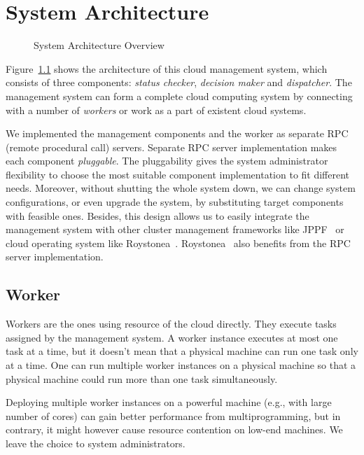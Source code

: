\chapter{System Architecture}


\begin{figure}
  \centering
  
  \caption{System Architecture Overview}
  \label{fig:archi-overview}
\end{figure}

Figure~\ref{fig:archi-overview} shows the architecture of this cloud
management system, which consists of three components: \emph{status
checker}, \emph{decision maker} and \emph{dispatcher}.  The management
system can form a complete cloud computing system by connecting with a
number of \emph{workers} or work as a part of existent cloud systems.

We implemented the management components and the worker as separate RPC
(remote procedural call) servers.  Separate RPC server implementation
makes each component \emph{pluggable}.  The pluggability gives the
system administrator flexibility to choose the most suitable component
implementation to fit different needs.  Moreover, without shutting the
whole system down, we can change system configurations, or even upgrade
the system,  by substituting target components with feasible ones.
Besides, this design allows us to easily integrate the management system
with other cluster management frameworks like JPPF~\cite{cite:JPPF} or
cloud operating system like Roystonea~\cite{cite:roystonea}.
Roystonea~\cite{cite:roystonea} also benefits from the RPC server
implementation.



\section{Worker}

Workers are the ones using resource of the cloud directly.  They execute
tasks assigned by the management system.  A worker instance executes at
most one task at a time, but it doesn't mean that a physical machine can
run one task only at a time.  One can run multiple worker instances on a
physical machine so that a physical machine could run more than one task
simultaneously.	 

Deploying multiple worker instances on a powerful machine (e.g., with
large number of cores) can gain better performance from
multiprogramming, but in contrary, it might however cause resource
contention on low-end machines.  We leave the choice to system
administrators.  

